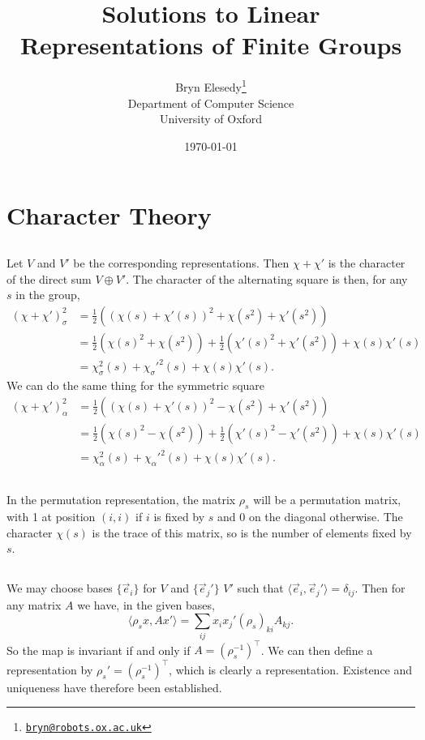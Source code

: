 \documentclass[a4paper, oneside, 10pt]{article}
\title{Solutions to Linear Representations of Finite Groups}
\author{%
    Bryn Elesedy\thanks{\href{mailto:bryn@robots.ox.ac.uk}{\texttt{bryn@robots.ox.ac.uk}}}\\
Department of Computer Science\\
University of Oxford}
\date{\today}
\numberwithin{Answer}{section}
\numberwithin{Exercise}{section}
\begin{document}
\maketitle
\tableofcontents
\clearpage
\setcounter{section}{1}

\section{Character Theory}
\subsection{}
Let $V$ and $V'$ be the corresponding representations.
Then $\chi + \chi'$ is the character of the direct sum $V \oplus V'$.
The character of the alternating square is then, for any $s$ in the group,
\begin{align*}
    (\chi + \chi')_{\sigma}^2
    &= \frac12 ((\chi(s) + \chi'(s))^2 + \chi(s^2) +\chi'(s^2)) \\
    &= \frac12(\chi(s)^2 + \chi(s^2)) + \frac12(\chi'(s)^2 + \chi'(s^2)) + \chi(s) \chi'(s)\\
    &= \chi_{\sigma}^2(s) + {\chi_{\sigma}'}^2(s) + \chi(s)\chi'(s).
\end{align*}
We can do the same thing for the symmetric square
\begin{align*}
    (\chi + \chi')_{\alpha}^2
    &= \frac12 ((\chi(s) + \chi'(s))^2 - \chi(s^2) +\chi'(s^2)) \\
    &= \frac12(\chi(s)^2 - \chi(s^2)) + \frac12(\chi'(s)^2 - \chi'(s^2)) + \chi(s) \chi'(s)\\
    &= \chi_{\alpha}^2(s) + {\chi_{\alpha}'}^2(s) + \chi(s)\chi'(s).
\end{align*}

\subsection{}
In the permutation representation, the matrix $\rho_s$ will be a permutation matrix, 
with 1 at position $(i, i)$ if $i$ is fixed by $s$ and 0 on the diagonal otherwise.
The character $\chi(s)$ is the trace of this matrix, so is the number of elements fixed by $s$.

\subsection{}
We may choose bases $\{\vec{e}_i\}$ for $V$ and $\{\vec{e}_j'\}$ $V'$ such that 
$\langle\vec{e}_i, \vec{e}_j'\rangle = \delta_{ij}$.
Then for any matrix $A$ we have, in the given bases,
\[
    \langle\rho_s x, Ax'\rangle = \sum_{ij}x_i x_j' (\rho_s)_{ki}A_{kj}.
\]
So the map is invariant if and only if $A = (\rho_s^{-1})^\top$. 
We can then define a representation by $\rho_s' = (\rho_s^{-1})^\top$, 
which is clearly a representation.
Existence and uniqueness have therefore been established.
\end{document}
